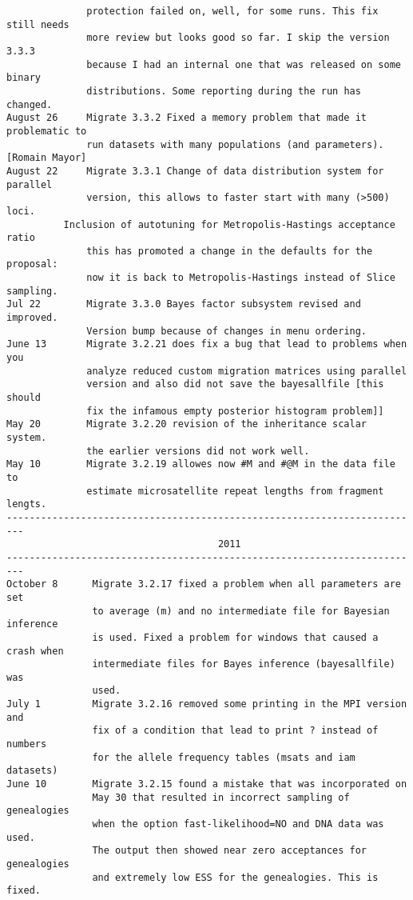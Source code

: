 \begin{small}
\begin{verbatim}
              protection failed on, well, for some runs. This fix still needs
              more review but looks good so far. I skip the version 3.3.3 
              because I had an internal one that was released on some binary 
              distributions. Some reporting during the run has changed.  
August 26     Migrate 3.3.2 Fixed a memory problem that made it problematic to 
              run datasets with many populations (and parameters).[Romain Mayor]
August 22     Migrate 3.3.1 Change of data distribution system for parallel
              version, this allows to faster start with many (>500) loci.
	      Inclusion of autotuning for Metropolis-Hastings acceptance ratio
              this has promoted a change in the defaults for the proposal:
              now it is back to Metropolis-Hastings instead of Slice sampling.
Jul 22        Migrate 3.3.0 Bayes factor subsystem revised and improved.
              Version bump because of changes in menu ordering. 
June 13       Migrate 3.2.21 does fix a bug that lead to problems when you 
              analyze reduced custom migration matrices using parallel 
              version and also did not save the bayesallfile [this should 
              fix the infamous empty posterior histogram problem]]
May 20        Migrate 3.2.20 revision of the inheritance scalar system.
              the earlier versions did not work well.
May 10        Migrate 3.2.19 allowes now #M and #@M in the data file to
              estimate microsatellite repeat lengths from fragment lengts. 
-------------------------------------------------------------------------
                                     2011
-------------------------------------------------------------------------
October 8      Migrate 3.2.17 fixed a problem when all parameters are set
               to average (m) and no intermediate file for Bayesian inference
               is used. Fixed a problem for windows that caused a crash when
               intermediate files for Bayes inference (bayesallfile) was
               used. 
July 1         Migrate 3.2.16 removed some printing in the MPI version and 
               fix of a condition that lead to print ? instead of numbers
               for the allele frequency tables (msats and iam datasets)
June 10        Migrate 3.2.15 found a mistake that was incorporated on
               May 30 that resulted in incorrect sampling of genealogies
               when the option fast-likelihood=NO and DNA data was used.
               The output then showed near zero acceptances for genealogies
               and extremely low ESS for the genealogies. This is fixed.

\end{verbatim}
\end{small}
